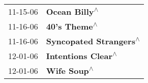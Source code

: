 \begin{supertabular}{p{0.25\columnwidth}p{0.75\columnwidth}}
 11-15-06 &                                     \textbf{Ocean Billy\textsuperscript{$\wedge$}} \\
 11-16-06 &                                      \textbf{40's Theme\textsuperscript{$\wedge$}} \\
 11-16-06 &                            \textbf{Syncopated Strangers\textsuperscript{$\wedge$}} \\
 12-01-06 &                                \textbf{Intentions Clear\textsuperscript{$\wedge$}} \\
 12-01-06 &                                       \textbf{Wife Soup\textsuperscript{$\wedge$}} \\
\end{supertabular}
